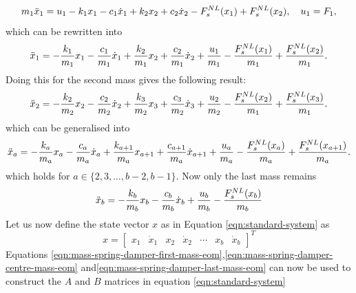\begin{equation*}
    m_1\Ddot{x}_1 = u_1 - k_1x_1 - c_1\dot{x}_1 + k_2x_2 + c_2\dot{x}_2 - F_s^{NL}(x_1) + F_s^{NL}(x_2), \quad u_1 = F_1,
\end{equation*}
which can be rewritten into
\begin{equation}\label{eqn:mass-spring-damper-first-mass-eom}
    \Ddot{x}_1 = -\frac{k_1}{m_1}x_1 -\frac{c_1}{m_1}\dot{x}_1 + \frac{k_2}{m_1}x_2 + \frac{c_2}{m_1}\dot{x}_2 + \frac{u_1}{m_1} - \frac{F_s^{NL}(x_1)}{m_1} + \frac{F_s^{NL}(x_2)}{m_1}.
\end{equation}
Doing this for the second mass gives the following result:
\begin{equation*}
    \Ddot{x}_2 = -\frac{k_2}{m_2}x_2 - \frac{c_2}{m_2}\dot{x}_2 + \frac{k_3}{m_2}x_3 + \frac{c_3}{m_2}\dot{x}_3 + \frac{u_2}{m_2} - \frac{F_s^{NL}(x_2)}{m_1} + \frac{F_s^{NL}(x_3)}{m_1}.
\end{equation*}
which can be generalised into
\begin{equation}\label{eqn:mass-spring-damper-centre-mass-eom}
    \Ddot{x}_a =  -\frac{k_a}{m_a}x_a - \frac{c_a}{m_a}\dot{x}_a + \frac{k_{a+1}}{m_a}x_{a+1} + \frac{c_{a+1}}{m_a}\dot{x}_{a+1} + \frac{u_a}{m_a} - \frac{F_s^{NL}(x_a)}{m_a} + \frac{F_s^{NL}(x_{a+1})}{m_a}.
\end{equation}
which holds for $a \in \{2,3,\dots,b-2,b-1\}$. Now only the last mass remains
\begin{equation}\label{eqn:mass-spring-damper-last-mass-eom}
    \Ddot{x}_b = -\frac{k_b}{m_b}x_b - \frac{c_b}{m_b}\dot{x}_b + \frac{u_b}{m_b} - \frac{F_s^{NL}(x_b)}{m_b}
\end{equation}
Let us now define the state vector $x$ as in Equation \eqref{eqn:standard-system} as
\begin{equation}\label{eqn:msd-x}
    x =
    \begin{bmatrix}
        x_1 & \dot{x}_1 & x_2 & \dot{x}_2 & \cdots & x_b & \dot{x}_{b}
    \end{bmatrix}^T
\end{equation}
Equations \eqref{eqn:mass-spring-damper-first-mass-eom},\eqref{eqn:mass-spring-damper-centre-mass-eom} and\eqref{eqn:mass-spring-damper-last-mass-eom} can now be used to construct the $A$ and $B$ matrices in equation \eqref{eqn:standard-system}

